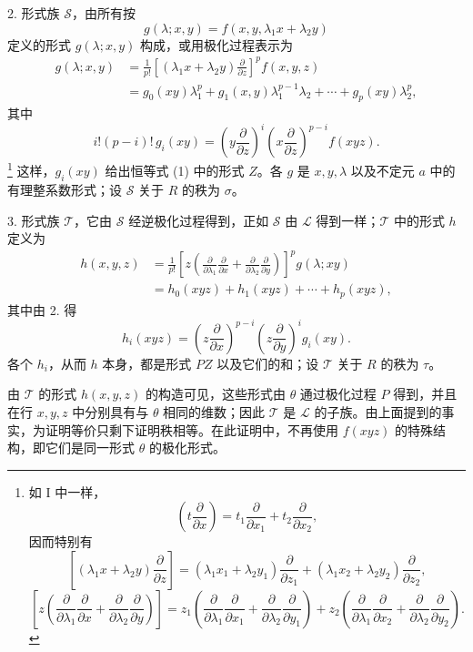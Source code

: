 2. 形式族 $\mathcal S$，由所有按
\[
  g(\lambda;x,y)=f(x,y,\lambda_1x+\lambda_2y)
\]
定义的形式 $g(\lambda;x,y)$ 构成，或用极化过程表示为
\[
\begin{aligned}
  g(\lambda;x,y)
  &=\frac1{p!}\left[(\lambda_1x+\lambda_2y)\frac{\partial}{\partial z}\right]^p f(x,y,z) \\
  &=g_0(xy)\lambda_1^p+g_1(x,y)\lambda_1^{p-1}\lambda_2+\cdots+g_p(xy)\lambda_2^p,
\end{aligned}
\]
其中
\[
  i!(p-i)!\,g_i(xy)=
  \left(y\frac{\partial}{\partial z}\right)^i
  \left(x\frac{\partial}{\partial z}\right)^{p-i}f(xyz).
\]
\footnote{如 I 中一样，
\[
 \left(t\frac{\partial}{\partial x}\right)=t_1\frac{\partial}{\partial x_1}+t_2\frac{\partial}{\partial x_2},
\]
因而特别有
\[
 \left[(\lambda_1x+\lambda_2y)\frac{\partial}{\partial z}\right]
 = (\lambda_1x_1+\lambda_2y_1)\frac{\partial}{\partial z_1}
 + (\lambda_1x_2+\lambda_2y_2)\frac{\partial}{\partial z_2},
\]
\[
 \left[z\left(\frac{\partial}{\partial\lambda_1}\frac{\partial}{\partial x}
 +\frac{\partial}{\partial\lambda_2}\frac{\partial}{\partial y}\right)\right]
 =z_1\left(\frac{\partial}{\partial\lambda_1}\frac{\partial}{\partial x_1}
 +\frac{\partial}{\partial\lambda_2}\frac{\partial}{\partial y_1}\right)
 +z_2\left(\frac{\partial}{\partial\lambda_1}\frac{\partial}{\partial x_2}
 +\frac{\partial}{\partial\lambda_2}\frac{\partial}{\partial y_2}\right).
\]}
这样，$g_i(xy)$ 给出恒等式 (1) 中的形式 $Z$。各 $g$ 是 $x,y,\lambda$ 以及不定元 $a$ 中的有理整系数形式；设 $\mathcal S$ 关于 $R$ 的秩为 $\sigma$。

3. 形式族 $\mathcal T$，它由 $\mathcal S$ 经逆极化过程得到，正如 $\mathcal S$ 由 $\mathcal L$ 得到一样；$\mathcal T$ 中的形式 $h$ 定义为
\[
\begin{aligned}
 h(x,y,z)
 &=\frac1{p!}\left[z\left(\frac{\partial}{\partial\lambda_1}\frac{\partial}{\partial x}
 +\frac{\partial}{\partial\lambda_2}\frac{\partial}{\partial y}\right)\right]^p g(\lambda;xy)\\
 &=h_0(xyz)+h_1(xyz)+\cdots+h_p(xyz),
\end{aligned}
\]
其中由 2. 得
\[
  h_i(xyz)=
  \left(z\frac{\partial}{\partial x}\right)^{p-i}
  \left(z\frac{\partial}{\partial y}\right)^i g_i(xy).
\]
各个 $h_i$，从而 $h$ 本身，都是形式 $PZ$ 以及它们的和；设 $\mathcal T$ 关于 $R$ 的秩为 $\tau$。

由 $\mathcal T$ 的形式 $h(x,y,z)$ 的构造可见，这些形式由 $\theta$ 通过极化过程 $P$ 得到，并且在行 $x,y,z$ 中分别具有与 $\theta$ 相同的维数；因此 $\mathcal T$ 是 $\mathcal L$ 的子族。由上面提到的事实，为证明等价只剩下证明秩相等。在此证明中，不再使用 $f(xyz)$ 的特殊结构，即它们是同一形式 $\theta$ 的极化形式。

